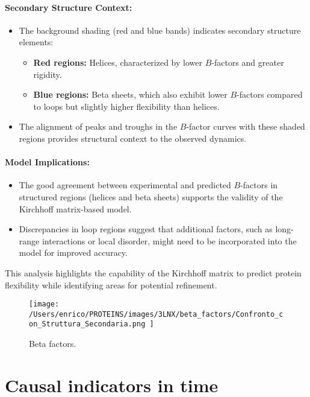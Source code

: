 \documentclass[English, Lau, oneside]{sapthesis}
\begin{document}
\paragraph{Secondary Structure Context:}
\begin{itemize}
    \item The background shading (red and blue bands) indicates secondary structure elements:
    \begin{itemize}
        \item \textbf{Red regions:} Helices, characterized by lower \( B \)-factors and greater rigidity.
        \item \textbf{Blue regions:} Beta sheets, which also exhibit lower \( B \)-factors compared to loops but slightly higher flexibility than helices.
    \end{itemize}
    \item The alignment of peaks and troughs in the \( B \)-factor curves with these shaded regions provides structural context to the observed dynamics.
\end{itemize}

\paragraph{Model Implications:}
\begin{itemize}
    \item The good agreement between experimental and predicted \( B \)-factors in structured regions (helices and beta sheets) supports the validity of the Kirchhoff matrix-based model.
    \item Discrepancies in loop regions suggest that additional factors, such as long-range interactions or local disorder, might need to be incorporated into the model for improved accuracy.
\end{itemize}

This analysis highlights the capability of the Kirchhoff matrix to predict protein flexibility while identifying areas for potential refinement.
\begin{figure}[h!]
    \centering
    \texttt{[image: /Users/enrico/PROTEINS/images/3LNX/beta\_factors/Confronto\_con\_Struttura\_Secondaria.png
    ]}
    \caption{Beta factors.}
\end{figure}



\newpage
\section{Causal indicators in time}
\end{document}
